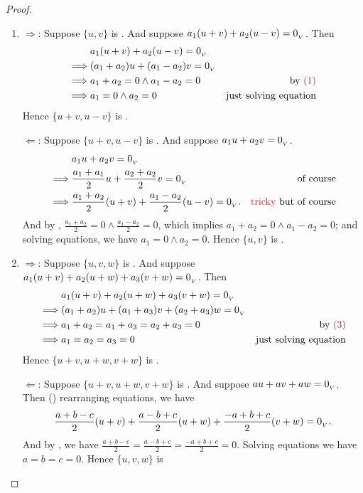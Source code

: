 \begin{proof}\ 

\begin{enumerate}
\item
\(\Longrightarrow\):
    Suppose \(\{ u, v \}\) is \LID{}. 
    And suppose \(a_1 (u + v) + a_2 (u - v) = 0_{_V}\).
    Then
    \begin{align*}
                 & a_1 (u + v) + a_2 (u - v) = \OV \\
        \implies & (a_1 + a_2) u + (a_1 - a_2) v = \OV \\
        \implies & a_1 + a_2 = 0 \land a_1 - a_2 = 0 & \text{by \MAROON{(1)}} \\
        \implies & a_1 = 0 \land a_2 = 0 & \text{just solving equation}
    \end{align*}
    Hence \(\{ u + v, u - v \}\) is \LID{}.

\(\Longleftarrow\):
    Suppose \(\{ u + v, u - v\}\) is \LID{}. 
    And suppose \(a_1 u + a_2 v = 0_{_V}\).
    \begin{align*}
                 & a_1 u + a_2 v = \OV \\
        \implies & \frac{a_1 + a_1}{2} u + \frac{a_2 + a_2}{2} v = \OV & \text{of course} \\
        \implies & \frac{a_1 + a_2}{2} (u + v) + \frac{a_1 - a_2}{2} (u - v) = \OV. & \text{\RED{tricky} but of course}
    \end{align*}
    And by , \(\frac{a_1 + a_2}{2} = 0 \land \frac{a_1 - a_2}{2} = 0\), which implies \(a_1 + a_2 = 0 \land a_1 - a_2 = 0\);
    and solving equations, we have \(a_1 = 0 \land a_2 = 0\).
    Hence \(\{ u, v \}\) is \LID{}.

\item
\(\Longrightarrow\):
    Suppose \(\{ u, v, w \}\) is \LID{}. 
    And suppose \(a_1 (u + v) + a_2 (u + w) + a_3 (v + w) = 0_{_V}\).
    Then
    \begin{align*}
                 & a_1 (u + v) + a_2 (u + w) + a_3 (v + w) = \OV \\
        \implies & (a_1 + a_2) u + (a_1 + a_3) v + (a_2 + a_3) w = \OV \\
        \implies & a_1 + a_2 = a_1 + a_3 = a_2 + a_3 = 0 & \text{by \MAROON{(3)}} \\
        \implies & a_1 = a_2 = a_3 = 0 & \text{just solving equation}
    \end{align*}
    Hence \(\{ u + v, u + w, v + w \}\) is \LID{}.

\(\Longleftarrow\):
    Suppose \(\{ u + v, u + w, v + w \}\) is \LID{}. 
    And suppose \(a u + a v + a w = 0_{_V}\).
    Then () rearranging equations, we have
    \[
        \frac{a + b - c}{2} (u + v) + \frac{a - b + c}{2} (u + w) + \frac{-a + b + c}{2} (v + w) = 0_{_V}.
    \]
    And by , we have \(\frac{a + b - c}{2} = \frac{a - b + c}{2} = \frac{-a + b + c}{2} = 0\).
    Solving equations we have \(a = b = c = 0\).
    Hence \(\{ u, v, w \}\) is \LID{}
\end{enumerate}
\end{proof}

